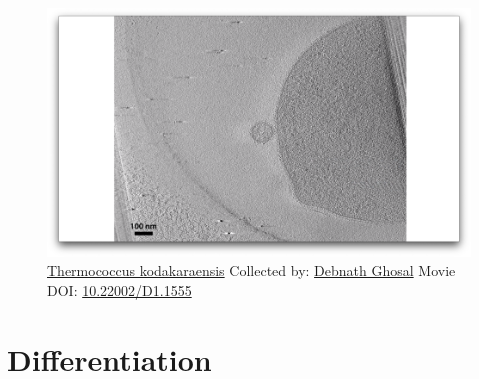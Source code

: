 \documentclass[]{tufte-book}
\begin{document}
\begin{figure}
\includegraphics{movie_stills/8_3} \caption[\protect\hyperlink{tree}{Thermococcus kodakaraensis} Collected
by: \protect\hyperlink{debnath_ghosal}{Debnath Ghosal} Movie DOI:
\href{https://doi.org/10.22002/D1.1555}{10.22002/D1.1555}]{\protect\hyperlink{tree}{Thermococcus kodakaraensis} Collected
by: \protect\hyperlink{debnath_ghosal}{Debnath Ghosal} Movie DOI:
\href{https://doi.org/10.22002/D1.1555}{10.22002/D1.1555}}\label{fig:8-3}
\end{figure}

\section{Differentiation}\label{differentiation}
\end{document}
